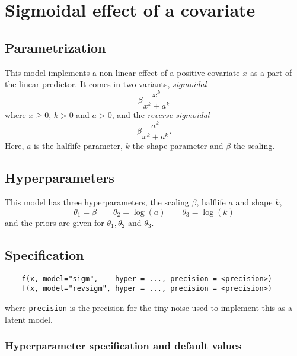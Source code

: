 \documentclass[a4paper,11pt]{article}
\begin{document}
\section*{Sigmoidal effect of a covariate}

\subsection*{Parametrization}

This model implements a non-linear effect of a positive covariate $x$
as a part of the linear predictor. It comes in two variants,
\emph{sigmoidal}
\begin{displaymath}
    \beta \frac{x^{k}}{x^{k} + a^{k}}
\end{displaymath}
where $x\ge 0$, $k>0$ and $a>0$, and the \emph{reverse-sigmoidal}
\begin{displaymath}
    \beta \frac{a^{k}}{x^{k} + a^{k}}.
\end{displaymath}
Here, $a$ is the halflife parameter, $k$ the shape-parameter and
$\beta$ the scaling.

\subsection*{Hyperparameters}

This model has three hyperparameters, the scaling $\beta$, halflife
$a$ and shape $k$,
\begin{displaymath}
    \theta_1 = \beta \qquad \theta_2 = \log(a) \qquad  \theta_3 = \log(k)
\end{displaymath}
and the priors are given for $\theta_1, \theta_2$ and $\theta_3$.


\subsection*{Specification}

\begin{verbatim}
    f(x, model="sigm",    hyper = ..., precision = <precision>)
    f(x, model="revsigm", hyper = ..., precision = <precision>)
\end{verbatim}
where \texttt{precision} is the precision for the tiny noise used to
implement this as a latent model. 

\subsubsection*{Hyperparameter specification and default values}

\end{document}
